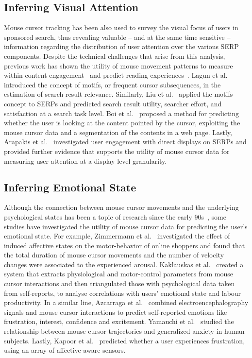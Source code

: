 \documentclass[sn-mathphys, pdflatex]{sn-jnl}
\begin{document}
\subsection{Inferring Visual Attention}
\label{sec:attention}

Mouse cursor tracking has been also used to survey the visual focus of users in sponsored search,
thus revealing valuable -- and at the same time sensitive -- information
regarding the distribution of user attention over the various SERP components.
Despite the technical challenges that arise from this analysis,
previous work has shown the utility of mouse movement patterns
to measure within-content engagement~\cite{Arapakis14_news}
and predict reading experiences~\cite{Arapakis14_gestures, Hauger11}.
Lagun et al.~\cite{Lagun14_motifs} introduced the concept of motifs,
or frequent cursor subsequences, in the estimation of search result relevance.
Similarly, Liu et al.~\cite{Liu15_opinions} applied the motifs concept to SERPs
and predicted search result utility, searcher effort, and satisfaction at a search task level.
Boi et al.~\cite{Boi2016} proposed a method for predicting whether the user is looking at the content pointed by the cursor,
exploiting the mouse cursor data and a segmentation of the contents in a web page.
Lastly, Arapakis et al.~\cite{Arapakis16_dds, Arapakis20_ppa}
investigated user engagement with direct displays on SERPs
and provided further evidence that supports the utility of mouse cursor data
for measuring user attention at a display-level granularity.

\subsection{Inferring Emotional State}
\label{sec:emotion}

Although the connection between mouse cursor movements and the underlying psychological states has been a topic of research
since the early 90s~\cite{Accot97_fitts, Card87_mouse},
some studies have investigated the utility of mouse cursor data for predicting the user's emotional state.
For example, Zimmermann et al.~\cite{Zimmermann2003} investigated the effect of induced affective states
on the motor-behavior of online shoppers and found that the total duration of mouse cursor movements
and the number of velocity changes were associated to the experienced arousal.
Kaklauskas et al.~\cite{Kaklauskas2009}
created a system that extracts physiological and motor-control parameters
from mouse cursor interactions and then triangulated those with psychological data taken from self-reports,
to analyse correlations with users' emotional state and labour productivity.
In a similar line, Azcarraga et al.~\cite{Azcarraga12_brain} combined electroencephalography signals and mouse cursor interactions
to predict self-reported emotions like frustration, interest, confidence and excitement.
Yamauchi et al.~\cite{Yamauchi13_anxiety} studied the relationship between mouse cursor trajectories and generalized anxiety in human subjects.
Lastly, Kapoor et al.~\cite{Kapoor07_frustration} predicted whether a user experiences frustration, using an array of affective-aware sensors.
\end{document}
